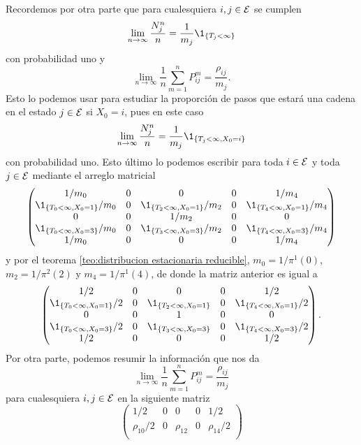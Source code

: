 \begin{example}
    Recordemos por otra parte que para cualesquiera $i,j \in \mathcal{E}$ se cumplen 
    \[
        \lim_{n \to \infty} \frac{N_j^n}{n} = \frac{1}{m_j} \1_{\{T_j < \infty\}}
    \]
    con probabilidad uno y
    \[
        \lim_{n \to \infty} \frac 1 n \sum_{m = 1}^n P_{ij}^m = \frac{\rho_{ij}}{m_j}.
    \]
    Esto lo podemos usar para estudiar la proporción de pasos que estará una cadena en el estado $j \in \mathcal{E}$ si $X_0 = i$, pues en este caso
    \[
        \lim_{n \to \infty} \frac{N_j^n}{n} = \frac{1}{m_j} \1_{\{T_j < \infty, X_0 = i\}}
    \]
    con probabilidad uno. Esto último lo podemos escribir para toda $i \in \mathcal{E}$ y toda $j \in \mathcal{E}$ mediante el arreglo matricial
    \[
        \begin{pmatrix}
            1/m_0 & 0 & 0 & 0 & 1/m_4 \\
            \1_{\{T_0 < \infty, X_0 = 1\}}/m_0 & 0 & \1_{\{T_2 < \infty, X_0 = 1\}}/m_2 & 0 & \1_{\{T_4 < \infty, X_0 = 1\}}/m_4 \\
            0 & 0 & 1/m_2 & 0 & 0 \\
            \1_{\{T_0 < \infty, X_0 = 3\}}/m_0 & 0 & \1_{\{T_3 < \infty, X_0 = 3\}}/m_2 & 0 & \1_{\{T_4 < \infty, X_0 = 3\}}/m_4 \\
            1/m_0 & 0 & 0 & 0 & 1/m_4 \\
        \end{pmatrix}
    \]
    y por el teorema \ref{teo:distribucion estacionaria reducible}, $m_0 = 1/\pi^1(0)$, $m_2 = 1/\pi^2(2)$ y $m_4 = 1/\pi^1(4)$, de donde la matriz anterior es igual a
    \[
        \begin{pmatrix}
            1/2 & 0 & 0 & 0 & 1/2 \\
            \1_{\{T_0 < \infty, X_0 = 1\}}/2 & 0 & \1_{\{T_2 < \infty, X_0 = 1\}} & 0 & \1_{\{T_4 < \infty, X_0 = 1\}}/2 \\
            0 & 0 & 1 & 0 & 0 \\
            \1_{\{T_0 < \infty, X_0 = 3\}}/2 & 0 & \1_{\{T_3 < \infty, X_0 = 3\}} & 0 & \1_{\{T_4 < \infty, X_0 = 3\}}/2 \\
            1/2 & 0 & 0 & 0 & 1/2
        \end{pmatrix}.
    \]
    Por otra parte, podemos resumir la información que nos da
    \[
        \lim_{n \to \infty} \frac 1 n \sum_{m = 1}^n P_{ij}^m = \frac{\rho_{ij}}{m_j}
    \] para cualesquiera $i, j \in \mathcal{E}$ en la siguiente matriz
    \[
        \begin{pmatrix}
            1/2 & 0 & 0 & 0 & 1/2 \\
            \rho_{10}/2 & 0 & \rho_{12} & 0 & \rho_{14}/2 \\

\end{pmatrix}\]
\end{example}
